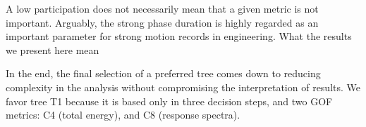 A low participation does not necessarily mean that a given metric is not important. Arguably, the strong phase duration is highly regarded as an important parameter for strong motion records in engineering. What the results we present here mean 



In the end, the final selection of a preferred tree comes down to reducing complexity in the analysis without compromising the interpretation of results. We favor tree T1 because it is based only in three decision steps, and two GOF metrics: C4 (total energy), and C8 (response spectra).



